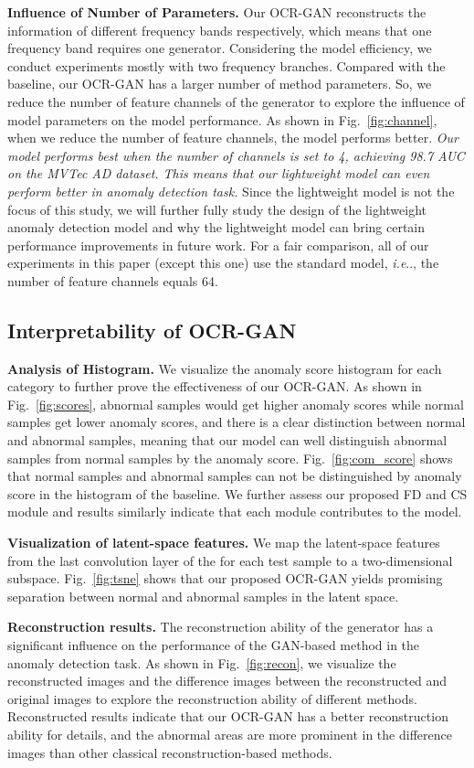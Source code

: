 \documentclass[lettersize,journal]{IEEEtran}
\makeatletter
\DeclareRobustCommand\onedot{\futurelet\@let@token\@onedot}
\def\@onedot{\ifx\@let@token.\else.\null\fi\xspace}
\def\ie{\emph{i.e}\onedot} \def\Ie{\emph{I.e}\onedot}
\makeatother
\begin{document}
\noindent\textbf{Influence of Number of Parameters.} Our OCR-GAN reconstructs the information of different frequency bands respectively, which means that one frequency band requires one generator. Considering the model efficiency, we conduct experiments mostly with two frequency branches. Compared with the baseline, our OCR-GAN has a larger number of method parameters. So, we reduce the number of feature channels of the generator to explore the influence of model parameters on the model performance. As shown in Fig.~\ref{fig:channel}, when we reduce the number of feature channels, the model performs better. \emph{Our model performs best when the number of channels is set to 4, achieving 98.7 AUC on the MVTec AD dataset. This means that our lightweight model can even perform better in anomaly detection task.} Since the lightweight model is not the focus of this study, we will further fully study the design of the lightweight anomaly detection model and why the lightweight model can bring certain performance improvements in future work. For a fair comparison, all of our experiments in this paper (except this one) use the standard model, \ie, the number of feature channels equals 64. 

\subsection{Interpretability of OCR-GAN}
\noindent\textbf{Analysis of Histogram.}
We visualize the anomaly score histogram for each category to further prove the effectiveness of our OCR-GAN. As shown in Fig.~\ref{fig:scores}, abnormal samples would get higher anomaly scores while normal samples get lower anomaly scores, and there is a clear distinction between normal and abnormal samples, meaning that our model can well distinguish abnormal samples from normal samples by the anomaly score. Fig.~\ref{fig:com_score} shows that normal samples and abnormal samples can not be distinguished by anomaly score in the histogram of the baseline. We further assess our proposed FD and CS module and results similarly indicate that each module contributes to the model.

\noindent\textbf{Visualization of latent-space features. }
We map the latent-space features from the last convolution layer of the  for each test sample to a two-dimensional subspace. Fig.~\ref{fig:tsne} shows that our proposed OCR-GAN yields promising separation between normal and abnormal samples in the latent space.

\noindent\textbf{Reconstruction results. }
The reconstruction ability of the generator has a significant influence on the performance of the GAN-based method in the anomaly detection task. As shown in Fig.~\ref{fig:recon}, we visualize the reconstructed images and the difference images between the reconstructed and original images to explore the reconstruction ability of different methods. Reconstructed results indicate that our OCR-GAN has a better reconstruction ability for details, and the abnormal areas are more prominent in the difference images than other classical reconstruction-based methods.
\end{document}
